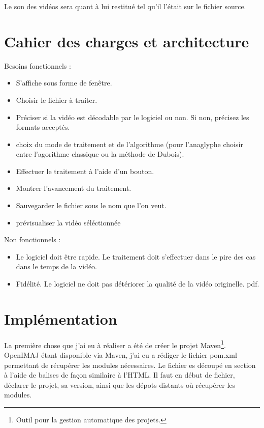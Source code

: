 \documentclass[10pt,a4paper]{article}
\begin{document}
Le son des vidéos sera quant à lui restitué tel qu'il l'était sur le fichier source.


\section{Cahier des charges et architecture}

Besoins fonctionnels :\newline
\begin{itemize}
\item S'affiche sous forme de fenêtre.
\item Choisir le fichier à traiter.
\item Préciser si la vidéo est décodable par le logiciel ou non. Si non, précisez les formats acceptés.
\item choix du mode de traitement et de l'algorithme (pour l'anaglyphe choisir entre l'agorithme classique ou la méthode
de Dubois).
\item Effectuer le traitement à l'aide d'un bouton.
\item Montrer l'avancement du traitement.
\item Sauvegarder le fichier sous le nom que l'on veut.
\item prévisualiser la vidéo séléctionnée\newline
\end{itemize}

Non fonctionnels :\newline
\begin{itemize}
\item Le logiciel doit être rapide. Le traitement doit s'effectuer dans le pire des cas dans le temps de la vidéo.
\item Fidélité. Le logiciel ne doit pas détériorer la qualité de la vidéo originelle.
pdf.\newline
\end{itemize}



\section{Implémentation}

La première chose que j'ai eu à réaliser a été de créer le projet Maven\footnote{Outil pour la gestion automatique des projets.}. OpenIMAJ étant disponible via Maven,
j'ai eu a rédiger le fichier pom.xml permettant de récupérer les modules nécessaires. Le fichier es découpé en section à l'aide de balises de façon similaire à l'HTML. Il faut en début de fichier,
déclarer le projet, sa version, ainsi que les dépots distants où récupérer les modules.
\end{document}
